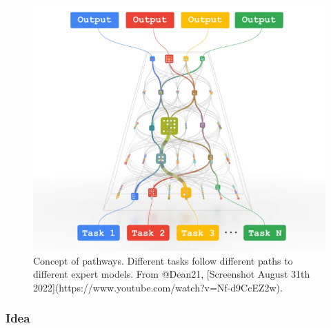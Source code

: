 \documentclass[
]{krantz}
\begin{document}
\begin{figure}

{\centering \includegraphics[width=0.8\linewidth]{figures/03-03-multipurpose/Pathways} 

}

\caption{Concept of pathways. Different tasks follow different paths to different expert models. From @Dean21, [Screenshot August 31th 2022](https://www.youtube.com/watch?v=Nf-d9CcEZ2w).}\label{fig:pathways}
\end{figure}

\hypertarget{idea}{%
\subsubsection{Idea}\label{idea}}
\end{document}
